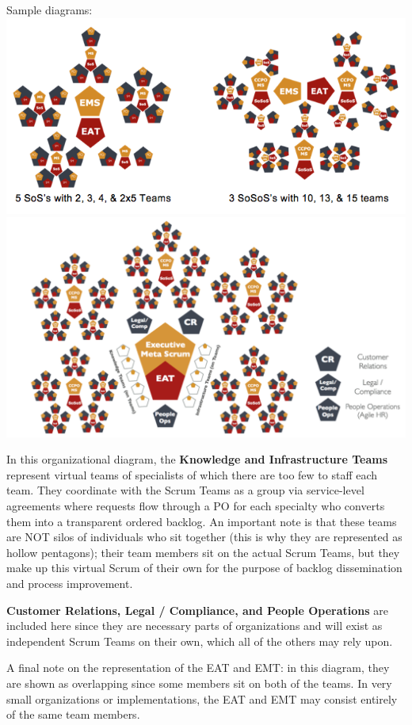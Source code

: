 \documentclass[12pt,a4paper,parskip=full]{scrartcl}
\begin{document}
Sample diagrams:
\includegraphics[width=1.0\linewidth]{VariableSoS-R2.png}
\includegraphics[width=1.0\linewidth]{OrganizationalDiagram.png}

In this organizational diagram, the \textbf{Knowledge and Infrastructure Teams} represent virtual teams of specialists of which there are too few to staff each team. They coordinate with the Scrum Teams as a group via service-level agreements where requests flow through a PO for each specialty who converts them into a transparent ordered backlog. An important note is that these teams are NOT silos of individuals who sit together (this is why they are represented as hollow pentagons); their team members sit on the actual Scrum Teams, but they make up this virtual Scrum of their own for the purpose of backlog dissemination and process improvement.

\textbf{Customer Relations, Legal / Compliance, and People Operations} are included here since they are necessary parts of organizations and will exist as independent Scrum Teams on their own, which all of the others may rely upon.

A final note on the representation of the EAT and EMT: in this diagram, they are shown as overlapping since some members sit on both of the teams. In very small organizations or implementations, the EAT and EMT may consist entirely of the same team members.
\end{document}
